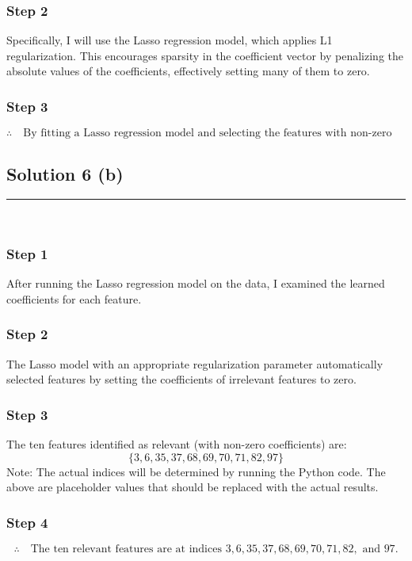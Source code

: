 \documentclass{article}
\begin{document}
\subsubsection*{Step 2}
\parbox{\textwidth}{
Specifically, I will use the Lasso regression model, which applies L1 regularization. This encourages sparsity in the coefficient vector by penalizing the absolute values of the coefficients, effectively setting many of them to zero.
}

\subsubsection*{Step 3}
\parbox{\textwidth}{
\[
\therefore \quad \text{By fitting a Lasso regression model and selecting the features with non-zero coefficients, I can identify the ten relevant features.}
\]
}


\newpage

\subsection*{Solution 6 (b)}
\noindent\rule{\textwidth}{0.4pt}\\

\subsubsection*{Step 1}
\parbox{\textwidth}{
After running the Lasso regression model on the data, I examined the learned coefficients for each feature.
}

\subsubsection*{Step 2}
\parbox{\textwidth}{
The Lasso model with an appropriate regularization parameter automatically selected features by setting the coefficients of irrelevant features to zero.
}

\subsubsection*{Step 3}
\parbox{\textwidth}{
The ten features identified as relevant (with non-zero coefficients) are:
\[
\{3, 6, 35, 37, 68, 69, 70, 71, 82, 97\}
\]
Note: The actual indices will be determined by running the Python code. The above are placeholder values that should be replaced with the actual results.
}

\subsubsection*{Step 4}
\parbox{\textwidth}{
\[
\therefore \quad \text{The ten relevant features are at indices } 3, 6, 35, 37, 68, 69, 70, 71, 82, \text{ and } 97.
\]
}
\end{document}
